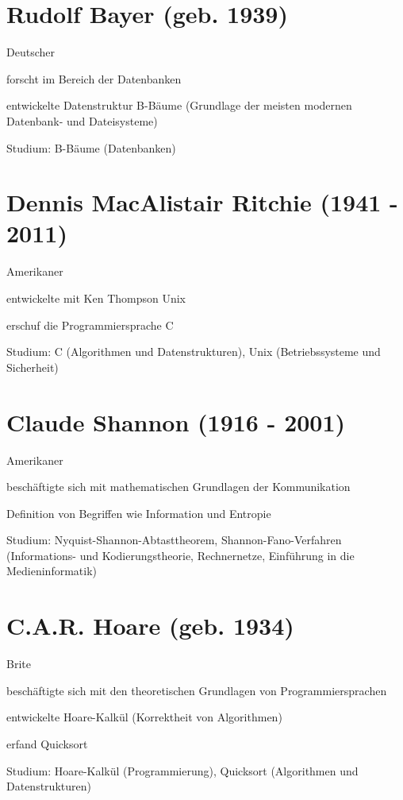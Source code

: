 \documentclass[a4paper,12pt]{report}
\begin{document}
\section*{Rudolf Bayer (geb. 1939)}
\begin{itemize*}
	\item Deutscher
	\item forscht im Bereich der Datenbanken
	\item entwickelte Datenstruktur B-Bäume (Grundlage der meisten modernen Datenbank- und
		  Dateisysteme)
	\item Studium: B-Bäume (Datenbanken)
\end{itemize*}

\section*{Dennis MacAlistair Ritchie (1941 - 2011)}
\begin{itemize*}
	\item Amerikaner
	\item entwickelte mit Ken Thompson Unix
	\item erschuf die Programmiersprache C
	\item Studium: C (Algorithmen und Datenstrukturen), Unix (Betriebssysteme und Sicherheit)
\end{itemize*}

\section*{Claude Shannon (1916 - 2001)}
\begin{itemize*}
	\item Amerikaner
	\item beschäftigte sich mit mathematischen Grundlagen der Kommunikation
	\item Definition von Begriffen wie Information und Entropie
	\item Studium: Nyquist-Shannon-Abtasttheorem, Shannon-Fano-Verfahren (Informations- und
	      Kodierungstheorie, Rechnernetze, Einführung in die Medieninformatik)
\end{itemize*}

\section*{C.A.R. Hoare (geb. 1934)}
\begin{itemize*}
	\item Brite
	\item beschäftigte sich mit den theoretischen Grundlagen von Programmiersprachen
	\item entwickelte Hoare-Kalkül (Korrektheit von Algorithmen)
	\item erfand Quicksort
	\item Studium: Hoare-Kalkül (Programmierung), Quicksort (Algorithmen und Datenstrukturen)
\end{itemize*}
\end{document}
